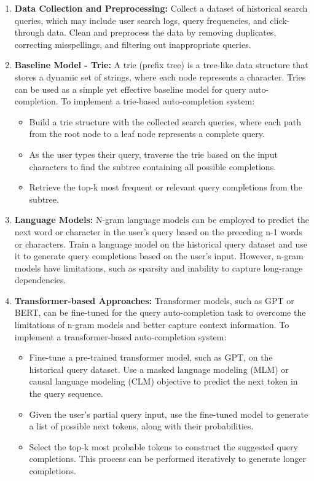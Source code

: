 \documentclass[12pt]{article}
\begin{document}
\begin{enumerate}
\item \textbf{Data Collection and Preprocessing:} Collect a dataset of historical search queries, which may include user search logs, query frequencies, and click-through data. Clean and preprocess the data by removing duplicates, correcting misspellings, and filtering out inappropriate queries.

\item \textbf{Baseline Model - Trie:} A trie (prefix tree) is a tree-like data structure that stores a dynamic set of strings, where each node represents a character. Tries can be used as a simple yet effective baseline model for query auto-completion. To implement a trie-based auto-completion system:

    \begin{itemize}
        \item Build a trie structure with the collected search queries, where each path from the root node to a leaf node represents a complete query.
        \item As the user types their query, traverse the trie based on the input characters to find the subtree containing all possible completions.
        \item Retrieve the top-k most frequent or relevant query completions from the subtree.
    \end{itemize}

\item \textbf{Language Models:} N-gram language models can be employed to predict the next word or character in the user's query based on the preceding n-1 words or characters. Train a language model on the historical query dataset and use it to generate query completions based on the user's input. However, n-gram models have limitations, such as sparsity and inability to capture long-range dependencies.

\item \textbf{Transformer-based Approaches:} Transformer models, such as GPT or BERT, can be fine-tuned for the query auto-completion task to overcome the limitations of n-gram models and better capture context information. To implement a transformer-based auto-completion system:

    \begin{itemize}
        \item Fine-tune a pre-trained transformer model, such as GPT, on the historical query dataset. Use a masked language modeling (MLM) or causal language modeling (CLM) objective to predict the next token in the query sequence.
        \item Given the user's partial query input, use the fine-tuned model to generate a list of possible next tokens, along with their probabilities.
        \item Select the top-k most probable tokens to construct the suggested query completions. This process can be performed iteratively to generate longer completions.
    \end{itemize}


\end{enumerate}
\end{document}
